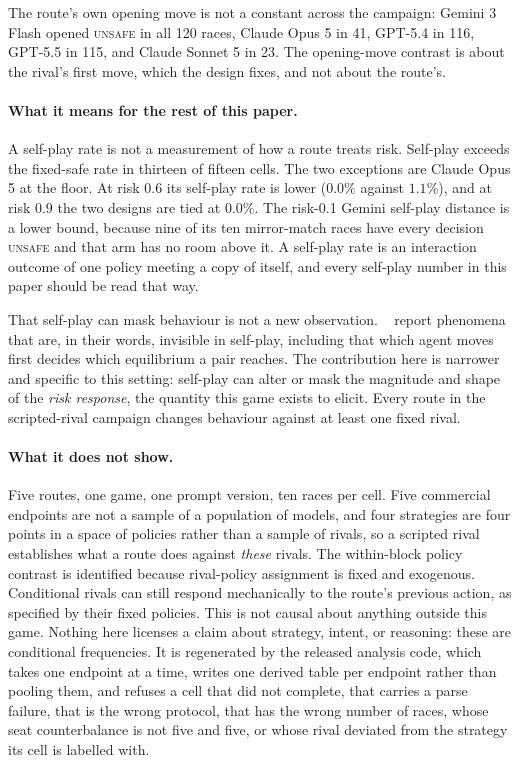 \documentclass{article}
\newcommand{\Unsafe}{\textsc{unsafe}}
\DeclareRobustCommand{\citet}[1]{\citeauthor{#1}~\shortcite{#1}}
\begin{document}
The route's own opening move is not a constant across the campaign: Gemini 3
Flash opened \Unsafe{} in all 120 races, Claude Opus 5 in 41, GPT-5.4 in 116,
GPT-5.5 in 115, and Claude Sonnet 5 in 23. The opening-move contrast is about
the rival's first move, which the design fixes, and not about the route's.

\paragraph{What it means for the rest of this paper.} A self-play rate is not a
measurement of how a route treats risk. Self-play exceeds the fixed-safe rate
in thirteen of fifteen cells. The two exceptions are Claude Opus 5 at the
floor. At risk $0.6$ its self-play rate is lower ($0.0\%$ against $1.1\%$), and
at risk $0.9$ the two designs are tied at $0.0\%$. The risk-0.1 Gemini self-play distance is a lower bound,
because nine of its ten mirror-match races have every decision \Unsafe{} and
that arm has no room above it. A self-play rate is an interaction outcome of
one policy meeting a copy of itself, and every self-play number in this paper
should be read that way.

That self-play can mask behaviour is not a new observation.
\citet{lekeasNashSuppression2026} report phenomena that are, in their words,
invisible in self-play, including that which agent moves first decides which
equilibrium a pair reaches. The contribution here is narrower and specific to
this setting: self-play can alter or mask the magnitude and shape of the
\emph{risk response}, the quantity this game exists to elicit. Every route in
the scripted-rival campaign changes behaviour against at least one fixed rival.

\paragraph{What it does not show.} Five routes, one game, one prompt version,
ten races per cell. Five commercial endpoints are not a sample of a population
of models, and four strategies are four points in a space of policies rather
than a sample of rivals, so a scripted rival establishes what a route does
against \emph{these} rivals. The within-block policy contrast is identified
because rival-policy assignment is fixed and exogenous. Conditional rivals can
still respond mechanically to the route's previous action, as specified by
their fixed policies. This is not causal about anything outside this game.
Nothing here licenses a claim about strategy, intent, or
reasoning: these are conditional frequencies. It is regenerated by the
released analysis code, which takes one endpoint at a time, writes one derived table per endpoint rather than
pooling them, and refuses a cell that did not complete, that carries a parse
failure, that is the wrong protocol, that has the wrong number of races, whose
seat counterbalance is not five and five, or whose rival deviated from the
strategy its cell is labelled with.
\end{document}
